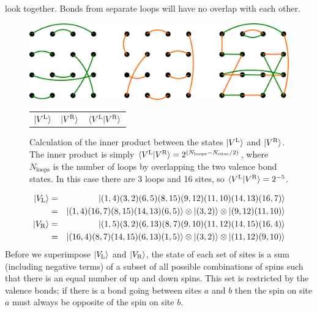 look together.  Bonds from separate loops will have no overlap with each other.
\begin{figure} {  
\centering
\includegraphics [width=5.5in]{./figures/made/overlap.pdf} 
\begin{tabular*}{5.5in}{ccc}
\hspace{12mm}$\lvert {V^\text{L}} \rangle$& 
\hspace{39mm}$\lvert {V^\text{R}} \rangle$ \hspace{40mm}& 
\hspace{33mm}$\langle {V^\text{L}} \rvert V^\text{R} \rangle$ \hspace{5mm}\\
\end{tabular*}
 \caption[Illustration of valence bond state inner product calculation]{
 Calculation of the inner product between the states $\lvert {V^\text{L}} \rangle$ and $\lvert {V^\text{R}} \rangle$.
 The inner product is simply 
 $\langle {V^\text{L}} \rvert V^\text{R} \rangle = 2^{(N_{\text{loops}}-N_{\text{sites}}/2)}$, 
 where $N_{\text{loops}}$ is the number of loops  by overlapping the 
 two valence bond states.
 In this case there are 3 loops and 16 sites, so 
 $\langle {V^\text{L}} \rvert V^\text{R} \rangle = 2^{-5}$.
 }
 \label{overlap}
 }
\end{figure}
\begin{eqnarray}
\lvert {V_\text{L}} \rangle &=&  \lvert {(1,4)(3,2)(6,5)(8,15)(9,12)(11,10)(14,13)(16,7)} \rangle\nonumber\\ 
			&=&  \lvert {(1,4)(16,7)(8,15)(14,13)(6,5)} \rangle\otimes\lvert {(3,2)} \rangle\otimes\lvert {(9,12)(11,10)} \rangle\\
\lvert {V_\text{R}} \rangle &=& \lvert {(1,5)(3,2)(6,13)(8,7)(9,10)(11,12)(14,15)(16,4)} \rangle\nonumber\\
			&=& \lvert {(16,4)(8,7)(14,15)(6,13)(1,5)} \rangle\otimes\lvert {(3,2)} \rangle\otimes\lvert {(11,12)(9,10)} \rangle
\end{eqnarray}
Before we superimpose $\lvert {V_\text{L}} \rangle$ and $\lvert {V_\text{R}} \rangle$, the state of each set of sites
is a sum (including negative terms) of a subset of all possible combinations of spins such that there is an equal number of up and down spins.  This set is restricted by the valence bonds; if there is a bond going between sites $a$ and $b$ then the spin on site $a$ must always be opposite of the spin on site $b$.  

